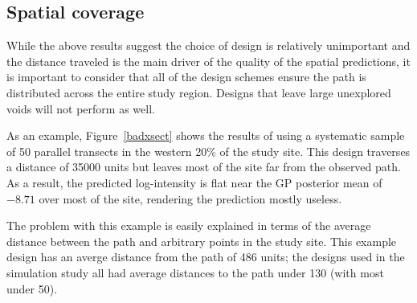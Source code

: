 \documentclass[review]{elsarticle}
\begin{document}
\subsection{Spatial coverage}

While the above results suggest the choice of design is relatively unimportant
and the distance traveled is the main driver of the quality of the spatial
predictions, it is important to consider that all of the design schemes ensure
the path is distributed across the entire study region. Designs that leave
large unexplored voids will not perform as well.

As an example, Figure~\ref{badxsect} shows the results of using a systematic
sample of 50 parallel transects in the western 20\% of the study site. This
design traverses a distance of 35000 units but leaves most of the site far from
the observed path. As a result, the predicted log-intensity is flat near the
GP posterior mean of \(-8.71\) over most of the site, rendering the prediction
mostly useless.

The problem with this example is easily explained in terms of the average
distance between the path and arbitrary points in the study site. This example
design has an averge distance from the path of 486 units; the designs used in
the simulation study all had average distances to the path under 130 (with most
under 50).
\end{document}
